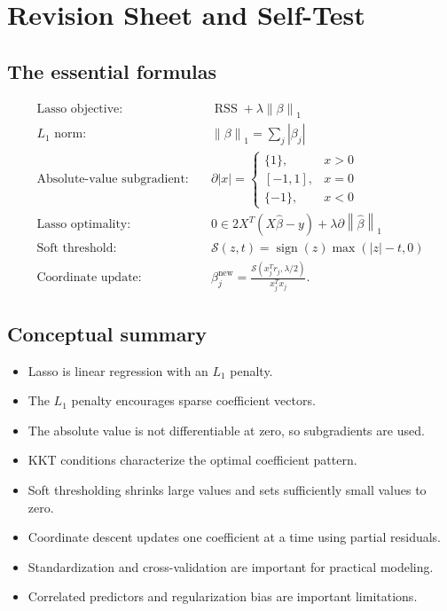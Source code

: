 \documentclass[11pt,a4paper,oneside]{book}
\newcommand{\norm}[1]{\left\lVert #1\right\rVert}
\newcommand{\abs}[1]{\left|#1\right|}
\newcommand{\soft}{\mathcal{S}}
\newcommand{\sign}{\operatorname{sign}}
\newcommand{\RSS}{\operatorname{RSS}}
\begin{document}
\chapter{Revision Sheet and Self-Test}
\section{The essential formulas}
\begin{align*}
  \text{Lasso objective:}\quad&\RSS+\lambda\norm{\beta}_1\\
  \text{$L_1$ norm:}\quad&\norm{\beta}_1=\sum_j\abs{\beta_j}\\
  \text{Absolute-value subgradient:}\quad&\partial\abs{x}=\begin{cases}\{1\},&x>0\\[-2pt][-1,1],&x=0\\[-2pt]\{-1\},&x<0\end{cases}\\
  \text{Lasso optimality:}\quad&0\in2X^T(X\hat\beta-y)+\lambda\partial\norm{\hat\beta}_1\\
  \text{Soft threshold:}\quad&\soft(z,t)=\sign(z)\max(\abs{z}-t,0)\\
  \text{Coordinate update:}\quad&\beta_j^{\mathrm{new}}=\frac{\soft(x_j^Tr_j,\lambda/2)}{x_j^Tx_j}.
\end{align*}

\section{Conceptual summary}
\begin{itemize}
  \item Lasso is linear regression with an $L_1$ penalty.
  \item The $L_1$ penalty encourages sparse coefficient vectors.
  \item The absolute value is not differentiable at zero, so subgradients are used.
  \item KKT conditions characterize the optimal coefficient pattern.
  \item Soft thresholding shrinks large values and sets sufficiently small values to zero.
  \item Coordinate descent updates one coefficient at a time using partial residuals.
  \item Standardization and cross-validation are important for practical modeling.
  \item Correlated predictors and regularization bias are important limitations.
\end{itemize}
\end{document}
